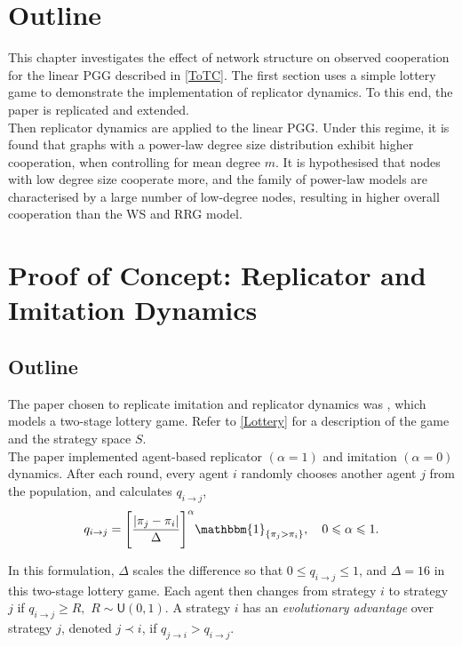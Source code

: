 \section{Outline}
This chapter investigates the effect of network structure on observed cooperation for the linear PGG described in \ref{ToTC}. The first section uses a simple lottery game to demonstrate the implementation of replicator dynamics. To this end, the paper \cite{RN30} is replicated and extended. \\

Then replicator dynamics are applied to the linear PGG. Under this regime, it is found that graphs with a power-law degree size distribution exhibit higher cooperation, when controlling for mean degree $m$. It is hypothesised that nodes with low degree size cooperate more, and the family of power-law models are characterised by a large number of low-degree nodes, resulting in higher overall cooperation than the WS and RRG model. \\
\section{Proof of Concept: Replicator and Imitation Dynamics} \label{Lottery_Me}
\subsection{Outline}
The paper chosen to replicate imitation and replicator dynamics was \cite{RN30}, which models a two-stage lottery game. Refer to \ref{Lottery} for a description of the game and the strategy space $S$. \\

The paper implemented agent-based replicator $(\alpha = 1)$ and imitation $(\alpha = 0)$ dynamics. After each round, every agent $i$ randomly chooses another agent $j$ from the population, and calculates $q_{i\to j}$, \\

\begin{equation} \label{rep}
q_{i\to j} = \Bigg[ \frac{|\pi_j - \pi_i|}{\Delta} \Bigg]^\alpha \mathbbm{1}_{\{\pi_j>\pi_i\}}, \quad  0 \leq \alpha \leq 1.\end{equation} 

In this formulation, $\Delta$ scales the difference so that $0 \leq q_{i\to j} \leq 1$, and $\Delta = 16$ in this two-stage lottery game. Each agent then changes from strategy $i$ to strategy $j$ if $q_{i\to j} \geq R,$ $R  \sim \mathsf{U}(0,1)$. A strategy $i$ has an \emph{evolutionary advantage} over strategy $j$, denoted $j \prec i$, if $q_{j \to i} >q_{i \to j}$.    \\

